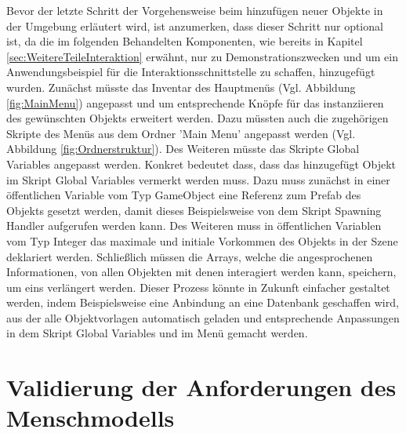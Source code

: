 \begin{enumerate}
	Bevor der letzte Schritt der Vorgehensweise beim hinzufügen neuer Objekte in der Umgebung erläutert wird, ist anzumerken, dass dieser Schritt nur optional ist, da die im folgenden Behandelten Komponenten, wie bereits in Kapitel \ref{sec:WeitereTeileInteraktion} erwähnt, nur zu Demonstrationszwecken und um ein Anwendungsbeispiel für die Interaktionsschnittstelle zu schaffen, hinzugefügt wurden. Zunächst müsste das Inventar des Hauptmenüs (Vgl. Abbildung \ref{fig:MainMenu}) angepasst und um entsprechende Knöpfe für das instanziieren des gewünschten Objekts erweitert werden. Dazu müssten auch die zugehörigen Skripte des Menüs aus dem Ordner 'Main Menu' angepasst werden (Vgl. Abbildung \ref{fig:Ordnerstruktur}). Des Weiteren müsste das Skripte Global Variables angepasst werden. Konkret bedeutet dass, dass das hinzugefügt Objekt im Skript Global Variables vermerkt werden muss. Dazu muss zunächst in einer öffentlichen Variable vom Typ GameObject eine Referenz zum Prefab des Objekts gesetzt werden, damit dieses Beispielsweise von dem Skript Spawning Handler aufgerufen werden kann. Des Weiteren muss in öffentlichen Variablen vom Typ Integer das maximale und initiale Vorkommen des Objekts in der Szene deklariert werden. Schließlich müssen die Arrays, welche die angesprochenen Informationen, von allen Objekten mit denen interagiert werden kann, speichern, um eins verlängert werden. Dieser Prozess könnte in Zukunft einfacher gestaltet werden, indem Beispielsweise eine Anbindung an eine Datenbank geschaffen wird, aus der alle Objektvorlagen automatisch geladen und entsprechende Anpassungen in dem Skript Global Variables und im Menü gemacht werden.
\end{enumerate}

\section{Validierung der Anforderungen des Menschmodells}\label{sec:ValidMensch}

